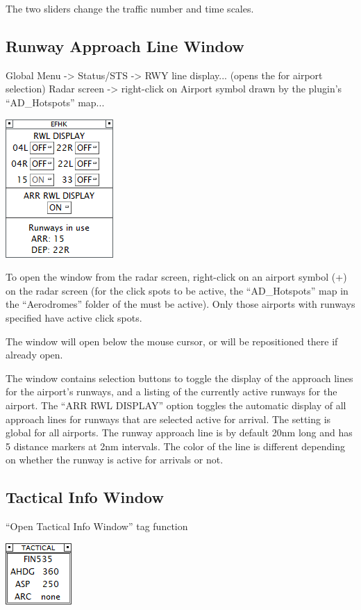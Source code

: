 \documentclass[11pt,a4paper,oldfontcommands]{memoir}
\begin{document}
The two sliders change the traffic number and time scales.

\subsection{Runway Approach Line Window}
\label{win:rapw}

Global Menu -> Status/STS -> RWY line display... (opens the \textit{} for airport selection)
Radar screen -> right-click on Airport symbol drawn by the plugin’s “AD\_Hotspots” map...

\includegraphics{img/rwydsp.png}

To open the window from the radar screen, right-click on an airport symbol (+) on the radar screen (for the click spots to be active, the “AD\_Hotspots” map in the “Aerodromes” folder of the \textit{} must be active). Only those airports with runways specified have active click spots.

The window will open below the mouse cursor, or will be repositioned there if already open.

The window contains selection buttons to toggle the display of the approach lines for the airport’s runways, and a listing of the currently active runways for the airport. The “ARR RWL DISPLAY” option toggles the automatic display of all approach lines for runways that are selected active for arrival. The setting is global for all airports. The runway approach line is by default 20nm long and has 5 distance markers at 2nm intervals. The color of the line is different depending on whether the runway is active for arrivals or not.

\subsection{Tactical Info Window}
\label{win:tiw}

“Open Tactical Info Window” tag function

\includegraphics{img/tiw.png}
\end{document}
